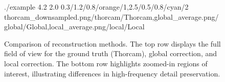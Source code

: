 \documentclass{article}
\begin{document}
\begin{figure}[htbp]
    \centering
    \TrioComparisonFigure
        {./example}
        {4.2}
        {2.0}
        {0.3/1.2/0.8/orange/1,2.5/0.5/0.8/cyan/2}
        {thorcam_downsampled.png/thorcam/Thorcam,global_average.png/global/Global,local_average.png/local/Local}

    \caption{Comparison of reconstruction methods. The top row displays the full field of view for the ground truth (Thorcam), global correction, and local correction. The bottom row highlights zoomed-in regions of interest, illustrating differences in high-frequency detail preservation.}
    \label{fig:reconstruction_comparison}
\end{figure}
\end{document}
